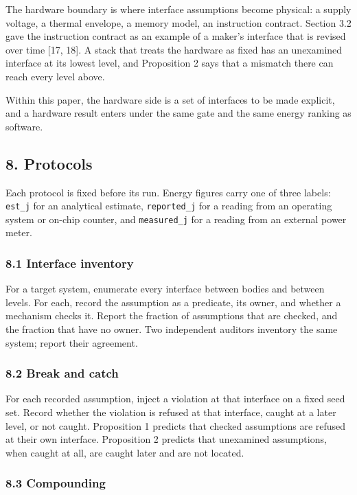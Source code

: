 \documentclass[
  10pt,
]{article}
\begin{document}
The hardware boundary is where interface assumptions become physical: a
supply voltage, a thermal envelope, a memory model, an instruction
contract. Section 3.2 gave the instruction contract as an example of a
maker's interface that is revised over time {[}17, 18{]}. A stack that
treats the hardware as fixed has an unexamined interface at its lowest
level, and Proposition 2 says that a mismatch there can reach every
level above.

Within this paper, the hardware side is a set of interfaces to be made
explicit, and a hardware result enters under the same gate and the same
energy ranking as software.

\subsection{8. Protocols}\label{protocols}

Each protocol is fixed before its run. Energy figures carry one of three
labels: \texttt{est\_j} for an analytical estimate, \texttt{reported\_j}
for a reading from an operating system or on-chip counter, and
\texttt{measured\_j} for a reading from an external power meter.

\subsubsection{8.1 Interface inventory}\label{interface-inventory}

For a target system, enumerate every interface between bodies and
between levels. For each, record the assumption as a predicate, its
owner, and whether a mechanism checks it. Report the fraction of
assumptions that are checked, and the fraction that have no owner. Two
independent auditors inventory the same system; report their agreement.

\subsubsection{8.2 Break and catch}\label{break-and-catch}

For each recorded assumption, inject a violation at that interface on a
fixed seed set. Record whether the violation is refused at that
interface, caught at a later level, or not caught. Proposition 1
predicts that checked assumptions are refused at their own interface.
Proposition 2 predicts that unexamined assumptions, when caught at all,
are caught later and are not located.

\subsubsection{8.3 Compounding}\label{compounding}
\end{document}
